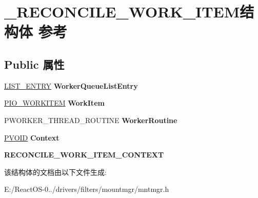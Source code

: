 \hypertarget{struct___r_e_c_o_n_c_i_l_e___w_o_r_k___i_t_e_m}{}\section{\+\_\+\+R\+E\+C\+O\+N\+C\+I\+L\+E\+\_\+\+W\+O\+R\+K\+\_\+\+I\+T\+E\+M结构体 参考}
\label{struct___r_e_c_o_n_c_i_l_e___w_o_r_k___i_t_e_m}
\subsection*{Public 属性}
\begin{DoxyCompactItemize}
\item 
\mbox{\label{struct___r_e_c_o_n_c_i_l_e___w_o_r_k___i_t_e_m_aa4b999ecdea74436fd09b6ec9652b672}} 
\hyperlink{struct___l_i_s_t___e_n_t_r_y}{L\+I\+S\+T\+\_\+\+E\+N\+T\+RY} {\bfseries Worker\+Queue\+List\+Entry}
\item 
\mbox{\label{struct___r_e_c_o_n_c_i_l_e___w_o_r_k___i_t_e_m_a2a2f64363afa71fde7f2e68b955e01fd}} 
\hyperlink{struct___i_o___w_o_r_k_i_t_e_m}{P\+I\+O\+\_\+\+W\+O\+R\+K\+I\+T\+EM} {\bfseries Work\+Item}
\item 
\mbox{\label{struct___r_e_c_o_n_c_i_l_e___w_o_r_k___i_t_e_m_a6cfdd9dd87f96c3bb95375303635bf16}} 
P\+W\+O\+R\+K\+E\+R\+\_\+\+T\+H\+R\+E\+A\+D\+\_\+\+R\+O\+U\+T\+I\+NE {\bfseries Worker\+Routine}
\item 
\mbox{\label{struct___r_e_c_o_n_c_i_l_e___w_o_r_k___i_t_e_m_af5624c3a7e6bcf22b3e64e57147e3310}} 
\hyperlink{interfacevoid}{P\+V\+O\+ID} {\bfseries Context}
\item 
\mbox{\label{struct___r_e_c_o_n_c_i_l_e___w_o_r_k___i_t_e_m_a435edc98ed10433a4ba399af36d4d0d3}} 
{\bfseries R\+E\+C\+O\+N\+C\+I\+L\+E\+\_\+\+W\+O\+R\+K\+\_\+\+I\+T\+E\+M\+\_\+\+C\+O\+N\+T\+E\+XT}
\end{DoxyCompactItemize}


该结构体的文档由以下文件生成\+:\begin{DoxyCompactItemize}
\item 
E\+:/\+React\+O\+S-\/0../drivers/filters/mountmgr/mntmgr.\+h\end{DoxyCompactItemize}
